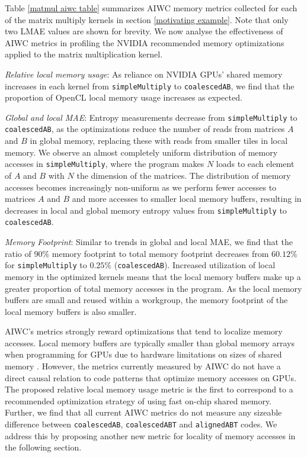 \documentclass[review=false, sigchi]{acmart}
\begin{document}
	Table \ref{matmul aiwc table} summarizes AIWC memory metrics collected for each of the matrix multiply kernels in section \ref{motivating example}. Note that only two LMAE values are shown for brevity. We now analyse the effectiveness of AIWC metrics in profiling the NVIDIA recommended memory optimizations applied to the matrix multiplication kernel.
	
	\textit{Relative local memory usage}: As reliance on NVIDIA GPUs' shared memory increases in each kernel from \texttt{simpleMultiply} to \texttt{coalescedAB}, we find that the proportion of OpenCL local memory usage increases as expected.
	
	\textit{Global and local MAE}: Entropy measurements decrease from \texttt{simpleMultiply} to \texttt{coalescedAB}, as the optimizations reduce the number of reads from matrices $A$ and $B$ in global memory, replacing these with reads from smaller tiles in local memory.
	We observe an almost completely uniform distribution of memory accesses in \texttt{simpleMultiply}, where the program makes $N$ loads to each element of $A$ and $B$ with $N$ the dimension of the matrices.
	The distribution of memory accesses becomes increasingly non-uniform as we perform fewer accesses to matrices $A$ and $B$ and more accesses to smaller local memory buffers, resulting in decreases in local and global memory entropy values from \texttt{simpleMultiply} to \texttt{coalescedAB}.
	
	\textit{Memory Footprint}: Similar to trends in global and local MAE, we find that the ratio of 90\% memory footprint to total memory footprint decreases from $60.12\%$ for \texttt{simpleMultiply} to $0.25\%$ (\texttt{coalescedAB}). Increased utilization of local memory in the optimized kernels means that the local memory buffers make up a greater proportion of total memory accesses in the program. As the local memory buffers are small and reused within a workgroup, the memory footprint of the local memory buffers is also smaller. 
	
	AIWC's metrics strongly reward optimizations that tend to localize memory accesses. Local memory buffers are typically smaller than global memory arrays when programming for GPUs due to hardware limitations on sizes of shared memory \cite{cudamanual}. However, the metrics currently measured by AIWC do not have a direct causal relation to code patterns that optimize memory accesses on GPUs. The proposed relative local memory usage metric is the first to correspond to a recommended optimization strategy of using fast on-chip shared memory. Further, we find that all current AIWC metrics do not measure any sizeable difference between \texttt{coalescedAB}, \texttt{coalescedABT} and \texttt{alignedABT} codes.
	We address this by proposing another new metric for locality of memory accesses in the following section.
	
\end{document}
